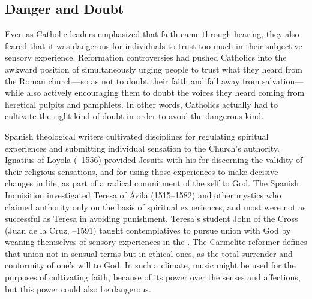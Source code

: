 \subsection{Danger and Doubt}

Even as Catholic leaders emphasized that faith came through hearing, they also
feared that it was dangerous for individuals to trust too much in their
subjective sensory experience.
Reformation controversies had pushed Catholics into the awkward position of
simultaneously urging people to trust what they heard from the Roman
church---so as not to doubt their faith and fall away from salvation---while
also actively encouraging them to doubt the voices they heard coming from
heretical pulpits and pamphlets.
In other words, Catholics actually had to cultivate the right kind of doubt in
order to avoid the dangerous kind.

Spanish theological writers cultivated disciplines for regulating spiritual
experiences and submitting individual sensation to the Church's authority.
Ignatius of Loyola (--1556) provided Jesuits with his
 for discerning the validity of their religious
sensations, and for using those experiences to make decisive changes in life, as
part of a radical commitment of the self to God.%
    \Autocite[]{Schreiner:Certainty}
The Spanish Inquisition investigated Teresa of Ávila (1515--1582) and other
mystics who claimed authority only on the basis of spiritual experiences, and
most were not as successful as Teresa in avoiding punishment.%
    \Autocites{Ahlgren:TeresaPolitics}{Francisca:Inquisition}
Teresa's student John of the Cross (Juan de la Cruz, --1591) taught
contemplatives to pursue union with God by weaning themselves of sensory
experiences in the .
The Carmelite reformer defines that union not in sensual terms but in ethical
ones, as the total surrender and conformity of one's will to God.%
    \Autocite
    [, , ]
    {JuandelaCruz:Subida} %
In such a climate, music might be used for the purposes of cultivating faith,
because of its power over the senses and affections, but this power could also
be dangerous.


